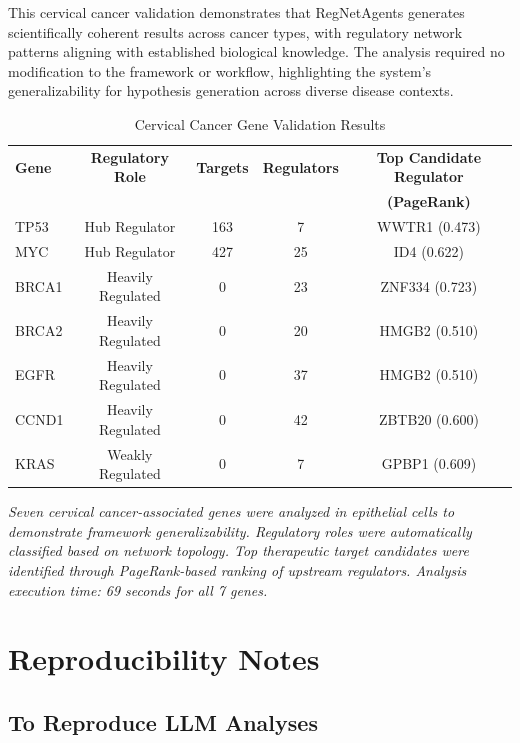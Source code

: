 \documentclass[11pt]{article}
\begin{document}
This cervical cancer validation demonstrates that RegNetAgents generates scientifically coherent results across cancer types, with regulatory network patterns aligning with established biological knowledge. The analysis required no modification to the framework or workflow, highlighting the system's generalizability for hypothesis generation across diverse disease contexts.

\begin{table}[htbp]
\centering
\caption{Cervical Cancer Gene Validation Results}
\begin{tabular}{lcccc}
\toprule
\textbf{Gene} & \textbf{Regulatory Role} & \textbf{Targets} & \textbf{Regulators} & \textbf{Top Candidate Regulator} \\
 & & & & \textbf{(PageRank)} \\
\midrule
TP53 & Hub Regulator & 163 & 7 & WWTR1 (0.473) \\
MYC & Hub Regulator & 427 & 25 & ID4 (0.622) \\
BRCA1 & Heavily Regulated & 0 & 23 & ZNF334 (0.723) \\
BRCA2 & Heavily Regulated & 0 & 20 & HMGB2 (0.510) \\
EGFR & Heavily Regulated & 0 & 37 & HMGB2 (0.510) \\
CCND1 & Heavily Regulated & 0 & 42 & ZBTB20 (0.600) \\
KRAS & Weakly Regulated & 0 & 7 & GPBP1 (0.609) \\
\bottomrule
\end{tabular}
\label{tab:cervical_validation}
\end{table}

\textit{Seven cervical cancer-associated genes were analyzed in epithelial cells to demonstrate framework generalizability. Regulatory roles were automatically classified based on network topology. Top therapeutic target candidates were identified through PageRank-based ranking of upstream regulators. Analysis execution time: 69 seconds for all 7 genes.}

\section{Reproducibility Notes}

\subsection{To Reproduce LLM Analyses}
\end{document}
